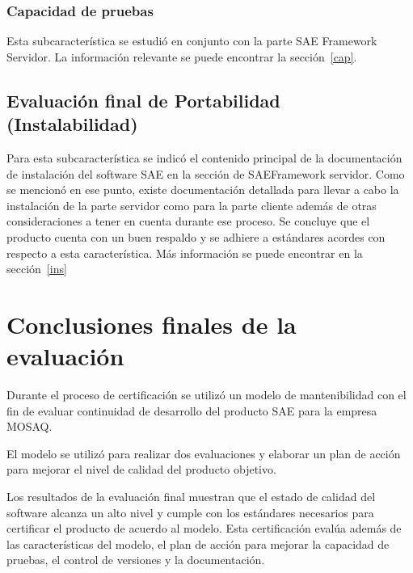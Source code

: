 \subsubsection{Capacidad de pruebas}

Esta subcaracterística se estudió en conjunto con la parte SAE Framework
Servidor. La información relevante se puede encontrar la sección~\ref{cap}.

\subsection{Evaluación final de Portabilidad (Instalabilidad)}

Para esta subcaracterística se indicó el contenido principal de la documentación de instalación
del software SAE en la sección de SAEFramework servidor. Como se mencionó en ese punto, existe
documentación detallada para llevar a cabo la instalación de la parte
servidor como para la parte cliente además de otras consideraciones a tener en cuenta durante ese proceso.
Se concluye que el producto cuenta con un buen respaldo y se adhiere
a estándares acordes con respecto a esta característica. Más información se puede encontrar en la sección~\ref{ins}

\section{Conclusiones finales de la evaluación}
Durante el proceso de certificación se utilizó un modelo de mantenibilidad
con el fin de evaluar continuidad de desarrollo del producto SAE para la empresa MOSAQ.

El modelo se utilizó para realizar dos evaluaciones y elaborar un plan de
acción para mejorar el nivel de calidad del producto objetivo.

Los resultados de la evaluación final muestran que el estado de calidad del
software alcanza un alto nivel y cumple con los estándares necesarios para
certificar el producto de acuerdo al modelo. Esta certificación evalúa
además de las características del modelo, el plan de
acción para mejorar la capacidad de pruebas, el control de versiones y la documentación.


